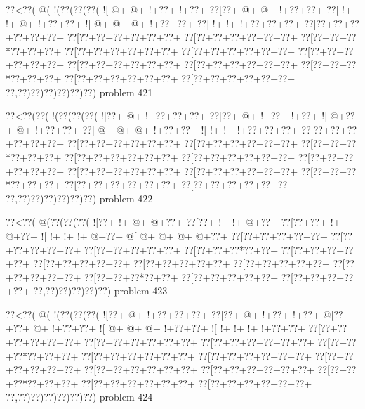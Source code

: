 \vbox{\vbox{\goo
\0??<\0??(\- @(\- !(\0??(\0??(\0??(
\- ![\- @+\- @+\- !+\0??+\- !+\0??+
\0??[\0??+\- @+\- @+\- !+\0??+\0??+
\0??[\- !+\- !+\- @+\- !+\0??+\0??+
\- ![\- @+\- @+\- @+\- !+\0??+\0??+
\0??[\- !+\- !+\- !+\0??+\0??+\0??+
\0??[\0??+\0??+\0??+\0??+\0??+\0??+
\0??[\0??+\0??+\0??+\0??+\0??+\0??+
\0??[\0??+\0??+\0??+\0??+\0??+\0??+
\0??[\0??+\0??+\0??*\0??+\0??+\0??+
\0??[\0??+\0??+\0??+\0??+\0??+\0??+
\0??[\0??+\0??+\0??+\0??+\0??+\0??+
\0??[\0??+\0??+\0??+\0??+\0??+\0??+
\0??[\0??+\0??+\0??+\0??+\0??+\0??+
\0??[\0??+\0??+\0??+\0??+\0??+\0??+
\0??[\0??+\0??+\0??*\0??+\0??+\0??+
\0??[\0??+\0??+\0??+\0??+\0??+\0??+
\0??[\0??+\0??+\0??+\0??+\0??+\0??+
\0??,\0??)\0??)\0??)\0??)\0??)\0??)
}
\hfil problem 421\hfil\break
}

\vbox{\vbox{\goo
\0??<\0??(\0??(\- !(\0??(\0??(\0??(
\- ![\0??+\- @+\- !+\0??+\0??+\0??+
\0??[\0??+\- @+\- !+\0??+\- !+\0??+
\- ![\- @+\0??+\- @+\- !+\0??+\0??+
\0??[\- @+\- @+\- @+\- !+\0??+\0??+
\- ![\- !+\- !+\- !+\0??+\0??+\0??+
\0??[\0??+\0??+\0??+\0??+\0??+\0??+
\0??[\0??+\0??+\0??+\0??+\0??+\0??+
\0??[\0??+\0??+\0??+\0??+\0??+\0??+
\0??[\0??+\0??+\0??*\0??+\0??+\0??+
\0??[\0??+\0??+\0??+\0??+\0??+\0??+
\0??[\0??+\0??+\0??+\0??+\0??+\0??+
\0??[\0??+\0??+\0??+\0??+\0??+\0??+
\0??[\0??+\0??+\0??+\0??+\0??+\0??+
\0??[\0??+\0??+\0??+\0??+\0??+\0??+
\0??[\0??+\0??+\0??*\0??+\0??+\0??+
\0??[\0??+\0??+\0??+\0??+\0??+\0??+
\0??[\0??+\0??+\0??+\0??+\0??+\0??+
\0??,\0??)\0??)\0??)\0??)\0??)\0??)
}
\hfil problem 422\hfil\break
}

\vbox{\vbox{\goo
\0??<\0??(\- @(\0??(\0??(\0??(
\- ![\0??+\- !+\- @+\- @+\0??+
\0??[\0??+\- !+\- !+\- @+\0??+
\0??[\0??+\0??+\- !+\- @+\0??+
\- ![\- !+\- !+\- !+\- @+\0??+
\- @[\- @+\- @+\- @+\- @+\0??+
\0??[\0??+\0??+\0??+\0??+\0??+
\0??[\0??+\0??+\0??+\0??+\0??+
\0??[\0??+\0??+\0??+\0??+\0??+
\0??[\0??+\0??+\0??*\0??+\0??+
\0??[\0??+\0??+\0??+\0??+\0??+
\0??[\0??+\0??+\0??+\0??+\0??+
\0??[\0??+\0??+\0??+\0??+\0??+
\0??[\0??+\0??+\0??+\0??+\0??+
\0??[\0??+\0??+\0??+\0??+\0??+
\0??[\0??+\0??+\0??*\0??+\0??+
\0??[\0??+\0??+\0??+\0??+\0??+
\0??[\0??+\0??+\0??+\0??+\0??+
\0??,\0??)\0??)\0??)\0??)\0??)
}
\hfil problem 423\hfil\break
}

\vbox{\vbox{\goo
\0??<\0??(\- @(\- !(\0??(\0??(\0??(
\- ![\0??+\- @+\- !+\0??+\0??+\0??+
\0??[\0??+\- @+\- !+\0??+\- !+\0??+
\- @[\0??+\0??+\- @+\- !+\0??+\0??+
\- ![\- @+\- @+\- @+\- !+\0??+\0??+
\- ![\- !+\- !+\- !+\- !+\0??+\0??+
\0??[\0??+\0??+\0??+\0??+\0??+\0??+
\0??[\0??+\0??+\0??+\0??+\0??+\0??+
\0??[\0??+\0??+\0??+\0??+\0??+\0??+
\0??[\0??+\0??+\0??*\0??+\0??+\0??+
\0??[\0??+\0??+\0??+\0??+\0??+\0??+
\0??[\0??+\0??+\0??+\0??+\0??+\0??+
\0??[\0??+\0??+\0??+\0??+\0??+\0??+
\0??[\0??+\0??+\0??+\0??+\0??+\0??+
\0??[\0??+\0??+\0??+\0??+\0??+\0??+
\0??[\0??+\0??+\0??*\0??+\0??+\0??+
\0??[\0??+\0??+\0??+\0??+\0??+\0??+
\0??[\0??+\0??+\0??+\0??+\0??+\0??+
\0??,\0??)\0??)\0??)\0??)\0??)\0??)
}
\hfil problem 424\hfil\break
}

